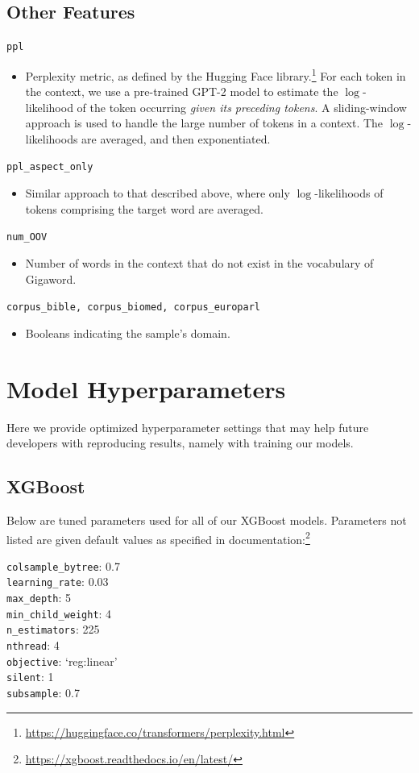\documentclass[11pt,a4paper]{article}
\begin{document}
\subsection{Other Features}

\texttt{ppl}
\begin{itemize}
  \item Perplexity metric, as defined by the Hugging Face library.\footnote{\url{https://huggingface.co/transformers/perplexity.html}} For each token in the context, we use a pre-trained GPT-2 model to estimate the $\log$-likelihood of the token occurring \textit{given its preceding tokens}. A sliding-window approach is used to handle the large number of tokens in a context. The $\log$-likelihoods are averaged, and then exponentiated.
\end{itemize}
\texttt{ppl\_aspect\_only}
\begin{itemize}
  \item Similar approach to that described above, where only $\log$-likelihoods of tokens comprising the target word are averaged.
\end{itemize}
\texttt{num\_OOV}
\begin{itemize}
  \item Number of words in the context that do not exist in the vocabulary of Gigaword.
\end{itemize}
\texttt{corpus\_bible, corpus\_biomed, corpus\_europarl}
\begin{itemize}
  \item Booleans indicating the sample's domain.
\end{itemize}

\section{Model Hyperparameters}

Here we provide optimized hyperparameter settings that may help future developers with reproducing results, namely with training our models.

\subsection{XGBoost}

Below are tuned parameters used for all of our XGBoost models. Parameters not listed are given default values as specified in documentation:\footnote{\url{https://xgboost.readthedocs.io/en/latest/}}

\indent \texttt{colsample\_bytree}: 0.7\\
\indent \texttt{learning\_rate}: 0.03\\
\indent \texttt{max\_depth}: 5\\
\indent \texttt{min\_child\_weight}: 4\\
\indent \texttt{n\_estimators}: 225\\
\indent \texttt{nthread}: 4\\
\indent \texttt{objective}: `reg:linear'\\
\indent \texttt{silent}: 1\\
\indent \texttt{subsample}: 0.7
\end{document}
